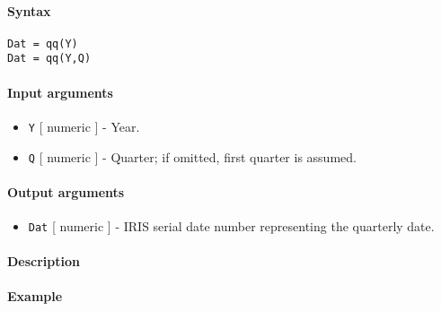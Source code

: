 


	\paragraph{Syntax}

\begin{verbatim}
Dat = qq(Y)
Dat = qq(Y,Q)
\end{verbatim}

\paragraph{Input arguments}

\begin{itemize}
\item
  \texttt{Y} {[} numeric {]} - Year.
\item
  \texttt{Q} {[} numeric {]} - Quarter; if omitted, first quarter is
  assumed.
\end{itemize}

\paragraph{Output arguments}

\begin{itemize}
\itemsep1pt\parskip0pt
\item
  \texttt{Dat} {[} numeric {]} - IRIS serial date number representing
  the quarterly date.
\end{itemize}

\paragraph{Description}

\paragraph{Example}


